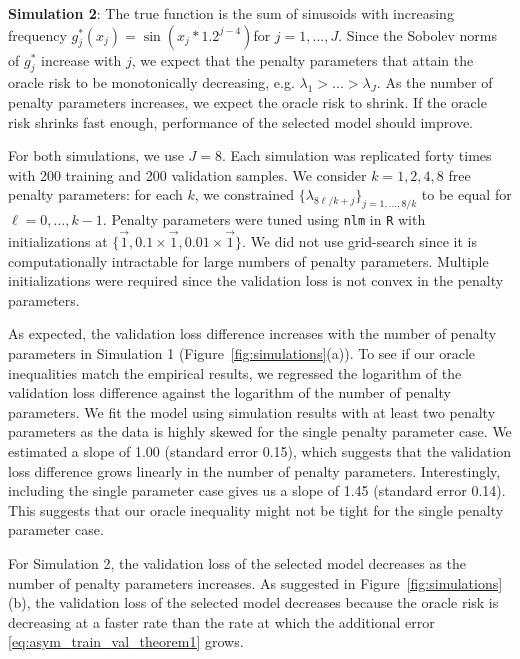 \documentclass[12pt]{article} %
\theoremstyle{definition}
\begin{document}
\noindent \textbf{Simulation 2}: The true function is the sum of sinusoids with increasing frequency
$g_j^*(x_j) = \sin(x_j * 1.2^{j - 4})$for $j = 1,...,J$.
Since the Sobolev norms of $g_j^*$ increase with $j$, we expect that the penalty parameters that attain the oracle risk to be monotonically decreasing, e.g. ${\lambda}_1 > ... > {\lambda}_J$. 
As the number of penalty parameters increases, we expect the oracle risk to shrink.
If the oracle risk shrinks fast enough, performance of the selected model should improve.

For both simulations, we use $J = 8$.
Each simulation was replicated forty times with 200 training and 200 validation samples.
We consider $k = 1, 2, 4, 8$ free penalty parameters: for each $k$, we constrained $\{\lambda_{8\ell/k + j} \}_{j = 1,...,8/k}$ to be equal for $\ell= 0,...,k - 1$.
Penalty parameters were tuned using \texttt{nlm} in \texttt{R} with initializations at $\{\vec{1}, 0.1 \times \vec{1}, 0.01 \times \vec{1}\}$. 
We did not use grid-search since it is computationally intractable for large numbers of penalty parameters.
Multiple initializations were required since the validation loss is not convex in the penalty parameters.

As expected, the validation loss difference increases with the number of penalty parameters in Simulation 1 (Figure~\ref{fig:simulations}(a)).
To see if our oracle inequalities match the empirical results, we regressed the logarithm of the validation loss difference against the logarithm of the number of penalty parameters.
We fit the model using simulation results with at least two penalty parameters as the data is highly skewed for the single penalty parameter case.
We estimated a slope of 1.00 (standard error 0.15), which suggests that the validation loss difference grows linearly in the number of penalty parameters.
Interestingly, including the single parameter case gives us a slope of 1.45 (standard error 0.14).
This suggests that our oracle inequality might not be tight for the single penalty parameter case.

For Simulation 2, the validation loss of the selected model decreases as the number of penalty parameters increases.
As suggested in Figure~\ref{fig:simulations}(b), the validation loss of the selected model decreases because the oracle risk is decreasing at a faster rate than the rate at which the additional error \eqref{eq:asym_train_val_theorem1} grows.
\end{document}
